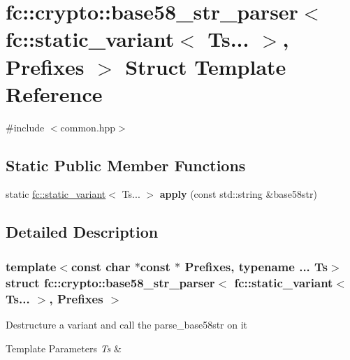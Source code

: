 \hypertarget{structfc_1_1crypto_1_1base58__str__parser_3_01fc_1_1static__variant_3_01_ts_8_8_8_01_4_00_01_prefixes_01_4}{}\section{fc\+:\+:crypto\+:\+:base58\+\_\+str\+\_\+parser$<$ fc\+:\+:static\+\_\+variant$<$ Ts... $>$, Prefixes $>$ Struct Template Reference}
\label{structfc_1_1crypto_1_1base58__str__parser_3_01fc_1_1static__variant_3_01_ts_8_8_8_01_4_00_01_prefixes_01_4}


{\ttfamily \#include $<$common.\+hpp$>$}

\subsection*{Static Public Member Functions}
\begin{DoxyCompactItemize}
\item 
\mbox{\label{structfc_1_1crypto_1_1base58__str__parser_3_01fc_1_1static__variant_3_01_ts_8_8_8_01_4_00_01_prefixes_01_4_a467f9f98bf9a9e7167bb1539b9815c11}} 
static \mbox{\hyperlink{classfc_1_1static__variant}{fc\+::static\+\_\+variant}}$<$ Ts... $>$ {\bfseries apply} (const std\+::string \&base58str)
\end{DoxyCompactItemize}


\subsection{Detailed Description}
\subsubsection*{template$<$const char $\ast$const $\ast$ Prefixes, typename ... Ts$>$\newline
struct fc\+::crypto\+::base58\+\_\+str\+\_\+parser$<$ fc\+::static\+\_\+variant$<$ Ts... $>$, Prefixes $>$}

Destructure a variant and call the parse\+\_\+base58str on it 
\begin{DoxyTemplParams}{Template Parameters}
{\em Ts} & \\
\hline
\end{DoxyTemplParams}

